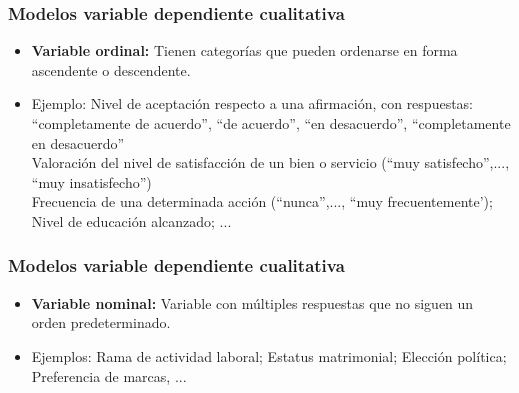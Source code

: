 \documentclass[10pt]{beamer}
\begin{document}
\begin{frame}
\frametitle{Modelos variable dependiente cualitativa}



\begin{itemize}

\item \textbf{Variable ordinal:} Tienen categorías que pueden ordenarse en forma ascendente o descendente. 

\item Ejemplo: Nivel de aceptación respecto a una afirmación, con respuestas: \\
``completamente de acuerdo'', ``de acuerdo'', ``en desacuerdo'', ``completamente en desacuerdo'' \\
\vspace{4mm}
Valoración del nivel de satisfacción de un bien o servicio (``muy satisfecho'',..., ``muy insatisfecho'')\\
\vspace{4mm}
Frecuencia de una determinada acción (``nunca'',..., ``muy frecuentemente'); Nivel de educación alcanzado; ...
\end{itemize}




\end{frame}





\begin{frame}
\frametitle{Modelos variable dependiente cualitativa}



\begin{itemize}

\item \textbf{Variable nominal:} Variable con múltiples respuestas que no siguen un orden predeterminado. 

\item Ejemplos: Rama de actividad laboral; Estatus matrimonial; Elección política; Preferencia de marcas, ...

\end{itemize}

\end{frame}


\end{document}
